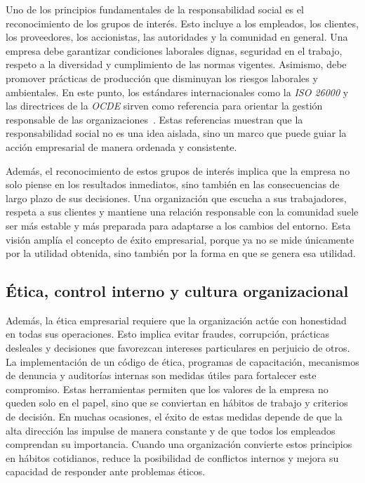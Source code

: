 Uno de los principios fundamentales de la responsabilidad social es el reconocimiento de los grupos de interés. Esto incluye a los empleados, los clientes, los proveedores, los accionistas, las autoridades y la comunidad en general. Una empresa debe garantizar condiciones laborales dignas, seguridad en el trabajo, respeto a la diversidad y cumplimiento de las normas vigentes. Asimismo, debe promover prácticas de producción que disminuyan los riesgos laborales y ambientales. En este punto, los estándares internacionales como la \textit{ISO 26000} y las directrices de la \textit{OCDE} sirven como referencia para orientar la gestión responsable de las organizaciones~\parencite{iso26000,ocde2011}. Estas referencias muestran que la responsabilidad social no es una idea aislada, sino un marco que puede guiar la acción empresarial de manera ordenada y consistente.

Además, el reconocimiento de estos grupos de interés implica que la empresa no solo piense en los resultados inmediatos, sino también en las consecuencias de largo plazo de sus decisiones. Una organización que escucha a sus trabajadores, respeta a sus clientes y mantiene una relación responsable con la comunidad suele ser más estable y más preparada para adaptarse a los cambios del entorno. Esta visión amplía el concepto de éxito empresarial, porque ya no se mide únicamente por la utilidad obtenida, sino también por la forma en que se genera esa utilidad.

\subsection*{Ética, control interno y cultura organizacional}

Además, la ética empresarial requiere que la organización actúe con honestidad en todas sus operaciones. Esto implica evitar fraudes, corrupción, prácticas desleales y decisiones que favorezcan intereses particulares en perjuicio de otros. La implementación de un código de ética, programas de capacitación, mecanismos de denuncia y auditorías internas son medidas útiles para fortalecer este compromiso. Estas herramientas permiten que los valores de la empresa no queden solo en el papel, sino que se conviertan en hábitos de trabajo y criterios de decisión. En muchas ocasiones, el éxito de estas medidas depende de que la alta dirección las impulse de manera constante y de que todos los empleados comprendan su importancia. Cuando una organización convierte estos principios en hábitos cotidianos, reduce la posibilidad de conflictos internos y mejora su capacidad de responder ante problemas éticos.

